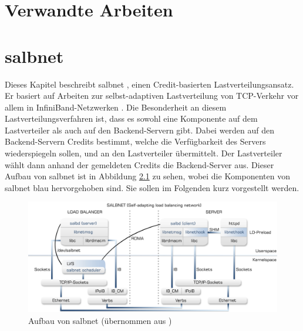 \documentclass[a4paper, 12pt, BCOR10mm, DIV12, toc=bibliography, toc=listof, german]{scrbook}
\begin{document}
	\chapter{Verwandte Arbeiten} %
	\label{cha:arbeiten}



	\chapter{salbnet} %
	\label{cha:salbnet}

		Dieses Kapitel beschreibt salbnet \cite{salbnet}, einen Credit-basierten
		Lastverteilungsansatz.  Er basiert auf Arbeiten zur selbst-adaptiven Lastverteilung von
		TCP-Verkehr vor allem in InfiniBand-Netzwerken \cite{zinke2007, scsczile2008,
		schneidenbach2009}. Die Besonderheit an diesem Lastverteilungsverfahren ist, dass es sowohl eine
		Komponente auf dem Lastverteiler als auch auf den Backend-Servern gibt. Dabei werden auf den
		Backend-Servern Credits bestimmt, welche die Verfügbarkeit des Servers wiederspiegeln sollen,
		und an den Lastverteiler übermittelt. Der Lastverteiler wählt dann anhand der gemeldeten
		Credits die Backend-Server aus. Dieser Aufbau von salbnet ist in Abbildung \ref{fig:salbnet} zu
		sehen, wobei die Komponenten von salbnet blau hervorgehoben sind. Sie sollen im Folgenden kurz
		vorgestellt werden.

		\begin{figure}
			\centering
			\includegraphics[width=\textwidth]{images/salbnet.png}
			\caption{Aufbau von salbnet (übernommen aus \cite{zinke2012})}
			\label{fig:salbnet}
		\end{figure}
\end{document}
